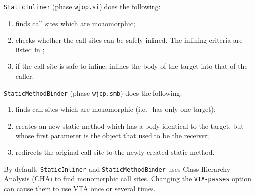 \documentclass{article}
\begin{document}
\par 

{\tt StaticInliner} (phase {\tt wjop.si}) does the following:
\begin{enumerate}
\item finds call sites which are monomorphic;
\item checks whether the call sites can be safely inlined. The inlining criteria are listed in
;
\item if the call site is safe to inline, inlines the body of the target into that of the caller.
\end{enumerate}

\par

{\tt StaticMethodBinder} (phase {\tt wjop.smb}) does the following: 
\begin{enumerate}
\item finds call sites which are monomorphic (i.e.~ has only one target);
\item creates an new static method which has a body identical to the target, but whose first 
parameter is the object that used to be the receiver;
\item redirects the original call site to the newly-created static method.
\end{enumerate}

By default, {\tt StaticInliner} and {\tt StaticMethodBinder} uses Class Hierarchy Analysis (CHA)
to find monomorphic call sites. Changing the {\tt VTA-passes} option can cause them to 
use VTA once or several times.
\end{document}
